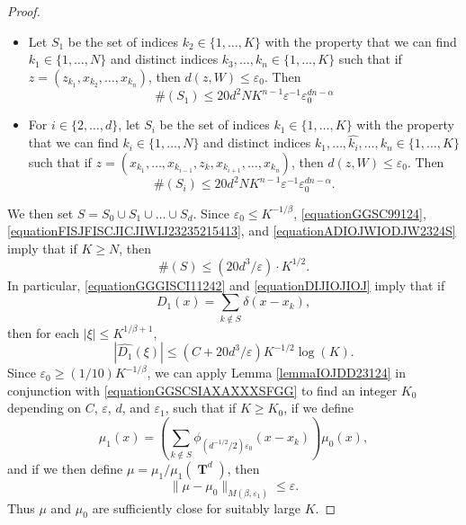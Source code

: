 \documentclass[12pt,reqno]{article}
\numberwithin{equation}{section}
\DeclareMathOperator{\TT}{\mathbf{T}}
\begin{document}
\begin{proof}
\begin{itemize}
        \item Let $S_1$ be the set of indices $k_2 \in \{ 1, \dots, K \}$ with the property that we can find $k_1 \in \{ 1, \dots, N \}$ and distinct indices $k_3, \dots, k_n \in \{ 1, \dots, K \}$ such that if $z = (z_{k_1}, x_{k_2}, \dots, x_{k_n})$, then $d(z,W) \leq \varepsilon_0$. Then
        \begin{equation} \label{equationFISJFISCJICJIWIJ23235215413}
            \#(S_1) \leq 20 d^2 N K^{n-1} \varepsilon^{-1} \varepsilon_0^{dn - \alpha}
        \end{equation}

        \item For $i \in \{ 2, \dots, d \}$, let $S_i$ be the set of indices $k_1 \in \{ 1, \dots, K \}$ with the property that we can find $k_i \in \{ 1, \dots, N \}$ and distinct indices $k_1, \dots, \widehat{k_i}, \dots, k_n \in \{ 1, \dots, K \}$ such that if $z = (x_{k_1}, \dots, x_{k_{i-1}}, z_k, x_{k_{i+1}}, \dots, x_{k_n})$, then $d(z,W) \leq \varepsilon_0$. Then
        \begin{equation} \label{equationADIOJWIODJW2324S}
            \#(S_i) \leq 20 d^2 N K^{n-1} \varepsilon^{-1} \varepsilon_0^{dn - \alpha}.
        \end{equation}
    \end{itemize}
    We then set $S = S_0 \cup S_1 \cup \dots \cup S_d$. Since $\varepsilon_0 \leq K^{-1/\beta}$, \eqref{equationGGSC99124}, \eqref{equationFISJFISCJICJIWIJ23235215413}, and \eqref{equationADIOJWIODJW2324S} imply that if $K \geq N$, then
    \begin{equation} \label{equationDIJIOJIOJ}
        \#(S) \leq (20d^3/\varepsilon) \cdot K^{1/2}.
    \end{equation}
    In particular, \eqref{equationGGGISCI11242} and \eqref{equationDIJIOJIOJ} imply that if
    \[ D_1(x) = \sum_{k \not \in S} \delta(x - x_k), \]
    then for each $|\xi| \leq K^{1/\beta + 1}$,
    \begin{equation} \label{equationGGSCSIAXAXXXSFGG}
        |\widehat{D_1}(\xi)| \leq (C+20 d^3/\varepsilon) K^{-1/2} \log(K).
    \end{equation}
    Since $\varepsilon_0 \geq (1/10) K^{-1/\beta}$, we can apply Lemma \ref{lemmaIOJDD23124} in conjunction with \eqref{equationGGSCSIAXAXXXSFGG} to find an integer $K_0$ depending on $C$, $\varepsilon$, $d$, and $\varepsilon_1$, such that if $K \geq K_0$, if we define
    \[ \mu_1(x) = \left( \sum_{k \not \in S} \phi_{(d^{-1/2}/2) \varepsilon_0}(x - x_k) \right) \mu_0(x), \]
    and if we then define $\mu = \mu_1 / \mu_1(\TT^d)$, then
    \begin{equation} \label{equationvVVV323285853S}
        \| \mu - \mu_0 \|_{M(\beta,\varepsilon_1)} \leq \varepsilon.
    \end{equation}
    Thus $\mu$ and $\mu_0$ are sufficiently close for suitably large $K$.


\end{proof}
\end{document}
